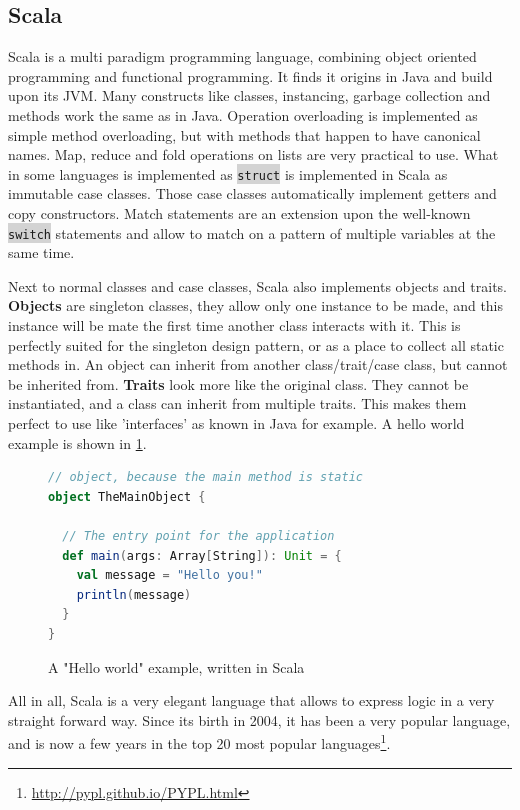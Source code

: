 \documentclass[onecolumn]{article}
\newcommand{\code}[1]{\colorbox{lightgray}{\texttt{#1}}}
\begin{document}
\subsection{Scala}Scala is a multi paradigm programming language, combining object oriented programming and functional programming. It finds it origins in Java and build upon its JVM. Many constructs like classes, instancing, garbage collection and methods work the same as in Java. Operation overloading is implemented as simple method overloading, but with methods that happen to have canonical names. Map, reduce and fold operations on lists are very practical to use. What in some languages is implemented as \code{struct} is implemented in Scala as immutable case classes. Those case classes automatically implement getters and copy constructors. Match statements are an extension upon the well-known \code{switch} statements and allow to match on a pattern of multiple variables at the same time. 

Next to normal classes and case classes, Scala also implements objects and traits. \textbf{Objects} are singleton classes, they allow only one instance to be made, and this instance will be mate the first time another class interacts with it. This is perfectly suited for the singleton design pattern, or as a place to collect all static methods in. An object can inherit from another class/trait/case class, but cannot be inherited from. \textbf{Traits} look more like the original class. They cannot be instantiated, and a class can inherit from multiple traits. This makes them perfect to use like 'interfaces' as known in Java for example. A hello world example is shown in \ref{fig:hello_world}. 

\begin{figure}[H]
    \centering
    \begin{lstlisting}[language=scala]
// object, because the main method is static
object TheMainObject {

  // The entry point for the application
  def main(args: Array[String]): Unit = {
    val message = "Hello you!"
    println(message)
  }
}
    \end{lstlisting}
    \caption{A "Hello world" example, written in Scala}
    \label{fig:hello_world}
\end{figure}

All in all, Scala is a very elegant language that allows to express logic in a very straight forward way. Since its birth in 2004, it has been a very popular language, and is now a few years in the top 20 most popular languages\footnote{\url{http://pypl.github.io/PYPL.html}}. 
\end{document}
